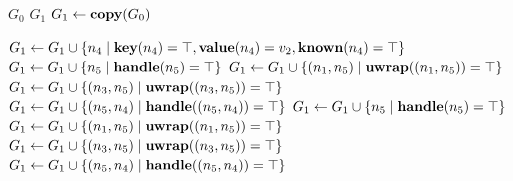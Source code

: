 \documentclass[]{article}
\begin{document}
\begin{algorithm}
    \caption{Unwrap}
    \begin{algorithmic}
        \Require $G_0$
        \Ensure $G_1$
        \State $G_1 \gets \textbf{copy}(G_0)$



        \State $G_1 \gets G_1 \cup \{ n_4 \mid \textbf{key}(n_4) = \top, \textbf{value}(n_4) = v_2, \textbf{known}(n_4) = \top \}$
        \State $G_1 \gets G_1 \cup \{ n_5 \mid \textbf{handle}(n_5) = \top \}$
        \State $G_1 \gets G_1 \cup \{ (n_1,n_5) \mid \textbf{uwrap}((n_1,n_5)) = \top \}$
        \State $G_1 \gets G_1 \cup \{ (n_3,n_5) \mid \textbf{uwrap}((n_3,n_5)) = \top \}$
        \State $G_1 \gets G_1 \cup \{ (n_5,n_4) \mid \textbf{handle}((n_5,n_4)) = \top \}$
        \Else
        \State $G_1 \gets G_1 \cup \{ n_5 \mid \textbf{handle}(n_5) = \top \}$
        \State $G_1 \gets G_1 \cup \{ (n_1,n_5) \mid \textbf{uwrap}((n_1,n_5)) = \top \}$
        \State $G_1 \gets G_1 \cup \{ (n_3,n_5) \mid \textbf{uwrap}((n_3,n_5)) = \top \}$
        \State $G_1 \gets G_1 \cup \{ (n_5,n_4) \mid \textbf{handle}((n_5,n_4)) = \top \}$
        \EndIf
        \EndIf
        \EndFor
        \EndFor
    \end{algorithmic}
\end{algorithm}
\end{document}
